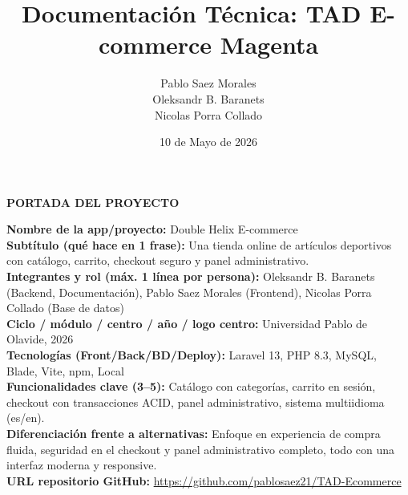 \documentclass[12pt,a4paper]{report}
\title{Documentación Técnica: TAD E-commerce Magenta}
\author{Pablo Saez Morales \\ Oleksandr B. Baranets \\ Nicolas Porra Collado}
\date{10 de Mayo de 2026}
\begin{document}
\begin{titlepage}
\thispagestyle{empty}
\begin{center}
\vspace*{1.5cm}
{\Huge \textbf{PORTADA DEL PROYECTO}}\\[1.2cm]

\begin{flushleft}
\textbf{Nombre de la app/proyecto:} Double Helix E-commerce\\[0.9cm] 

\textbf{Subtítulo (qué hace en 1 frase):} Una tienda online de artículos deportivos con catálogo, carrito, checkout seguro y panel administrativo.\\[0.9cm]

\textbf{Integrantes y rol (máx. 1 línea por persona):} Oleksandr B. Baranets (Backend, Documentación), 
Pablo Saez Morales (Frontend), 
Nicolas Porra Collado (Base de datos)\\[0.9cm]

\textbf{Ciclo / módulo / centro / año / logo centro:} Universidad Pablo de Olavide, 2026\\[0.9cm]

\textbf{Tecnologías (Front/Back/BD/Deploy):} Laravel 13, PHP 8.3, MySQL, Blade, Vite, npm, Local\\[0.9cm]

\textbf{Funcionalidades clave (3--5):} Catálogo con categorías, carrito en sesión, checkout con transacciones ACID, panel administrativo, sistema multiidioma (es/en).\\[0.9cm]

\textbf{Diferenciación frente a alternativas:} Enfoque en experiencia de compra fluida, seguridad en el checkout y panel administrativo completo, todo con una interfaz moderna y responsive.\\[0.9cm]

\textbf{URL repositorio GitHub:}  \url{https://github.com/pablosaez21/TAD-Ecommerce}
\end{flushleft}

\vfill
\end{center}
\end{titlepage}
\end{document}
